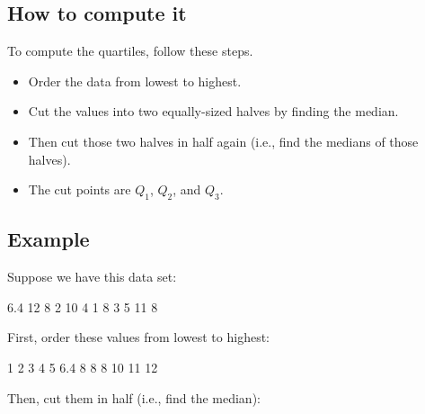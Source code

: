 \documentclass[../../../main.tex]{subfiles}
\begin{document}
\subsection{How to compute it}

To compute the quartiles, follow these steps.

\begin{itemize}
  \item Order the data from lowest to highest.
  \item Cut the values into two equally-sized halves by finding the median.
  \item Then cut those two halves in half again (i.e., find the medians of those halves). 
  \item The cut points are $Q_{1}$, $Q_{2}$, and $Q_{3}$.
\end{itemize}


\subsection{Example}

Suppose we have this data set:

\begin{center}
  6.4 12 8 2 10 4 1 8 3 5 11 8
\end{center}

\noindent
First, order these values from lowest to highest:

\begin{center}
  1 2 3 4 5 6.4 8 8 8 10 11 12
\end{center}

\noindent
Then, cut them in half (i.e., find the median):

\begin{center}
\end{center}
\end{document}
